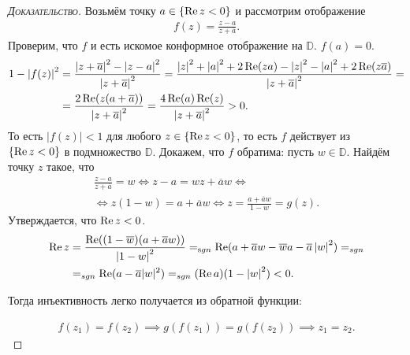\documentclass[../complex-analysis.tex]{subfiles}
\begin{document}
\begin{proof}[\normalfont\textsc{Доказательство}]
 Возьмём точку $ a \in \left\{ \operatorname{Re} z < 0 \right\} $ и рассмотрим отображение
 \begin{align*}
  f(z) = \frac{z-a}{z+\overline a}.
 \end{align*} Проверим, что $ f $ и есть искомое конформное отображение на $ \mathbb D $. $ f(a) = 0 $.
 \begin{align*}
  1 - \left| f(z) \right|^{2} &= \frac{\left| z+\overline a \right|^{2} - \left| z-a \right|^{2}}{\left| z+\overline a \right|^{2}} = \frac{\left| z \right|^{2} + \left| a \right|^{2} + 2 \operatorname{Re}(za) -\left| z \right|^{2} - \left| a \right|^{2} + 2 \operatorname{Re}(z \overline a)}{\left| z+\overline a \right|^{2}} = \\
  &= \frac{2 \operatorname{Re}(z(a+\overline a))}{\left| z+\overline a \right|^{2}} = \frac{4\operatorname{Re}(a)\operatorname{Re}(z)}{\left| z+\overline a \right|^{2}} > 0.
 \end{align*}
То есть $ \left| f(z) \right|< 1 $ для любого $ z \in \left\{ \operatorname{Re} z < 0 \right\}$, то есть $ f $ действует из $ \left\{ \operatorname{Re} z < 0 \right\} $ в подмножество $ \mathbb D $. Докажем, что $ f $ обратима: пусть $ w \in \mathbb D $. Найдём точку $ z $ такое, что
\begin{align*}
 \frac{z-a}{z+\overline a} = w \iff z-a = wz + \overline a w \iff \\ \iff z(1-w) = a + \overline a w \iff z = \frac{a + \overline a w}{1 - w} = g(z).
\end{align*} Утверждается, что $ \operatorname{Re} z < 0 $.
\begin{align*}
  \operatorname{Re} z &= \frac{\operatorname{Re}((1 - \overline w)(a + \overline a w))}{\left| 1-w \right|^{2}} =_{\mathrm sgn} \operatorname{Re}(a + \overline a w - \overline w a - \overline a \left| w \right|^{2}) =_{sgn} \\
  &=_{sgn} \operatorname{Re}(a - \overline a |w|^2) =_{sgn} (\operatorname{Re} a)(1 - \left| w \right|^{2}) < 0.
\end{align*}

Тогда инъективность легко получается из обратной функции:

\begin{align*}
	f(z_1) = f(z_2) \implies g(f(z_1)) = g(f(z_2)) \implies z_1 = z_2.
\end{align*}

\end{proof} 
\end{document}
